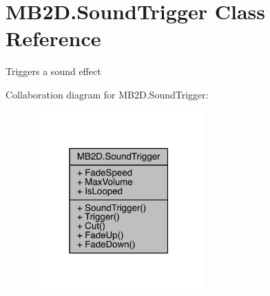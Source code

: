 \hypertarget{class_m_b2_d_1_1_sound_trigger}{}\section{M\+B2\+D.\+Sound\+Trigger Class Reference}
\label{class_m_b2_d_1_1_sound_trigger}


Triggers a sound effect  




Collaboration diagram for M\+B2\+D.\+Sound\+Trigger\+:\nopagebreak
\begin{figure}[H]
\begin{center}
\leavevmode
\includegraphics[width=187pt]{class_m_b2_d_1_1_sound_trigger__coll__graph}
\end{center}
\end{figure}
